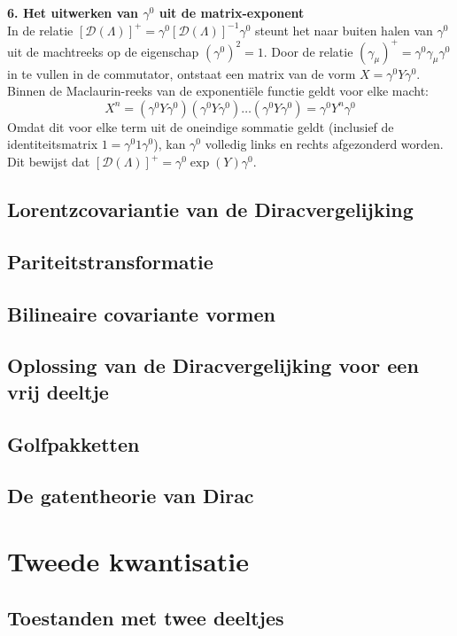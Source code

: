 \documentclass[a4paper,twoside]{article}
\theoremstyle{definition}
\theoremstyle{plain}
\begin{document}
\textbf{6. Het uitwerken van $\gamma^0$ uit de matrix-exponent} \\
In de relatie $[\mathcal{D}(\Lambda)]^+ = \gamma^0 [\mathcal{D}(\Lambda)]^{-1} \gamma^0$ steunt het naar buiten halen van $\gamma^0$ uit de machtreeks op de eigenschap $(\gamma^0)^2 = 1$. Door de relatie $(\gamma_\mu)^+ = \gamma^0 \gamma_\mu \gamma^0$ in te vullen in de commutator, ontstaat een matrix van de vorm $X = \gamma^0 Y \gamma^0$. Binnen de Maclaurin-reeks van de exponentiële functie geldt voor elke macht:
\begin{equation}
X^n = (\gamma^0 Y \gamma^0)(\gamma^0 Y \gamma^0) \dots (\gamma^0 Y \gamma^0) = \gamma^0 Y^n \gamma^0
\end{equation}
Omdat dit voor elke term uit de oneindige sommatie geldt (inclusief de identiteitsmatrix $1 = \gamma^0 1 \gamma^0$), kan $\gamma^0$ volledig links en rechts afgezonderd worden. Dit bewijst dat $[\mathcal{D}(\Lambda)]^+ = \gamma^0 \exp(Y) \gamma^0$.

\subsection{Lorentzcovariantie van de Diracvergelijking}
\subsection{Pariteitstransformatie}
\subsection{Bilineaire covariante vormen}
\subsection{Oplossing van de Diracvergelijking voor een vrij deeltje}
\subsection{Golfpakketten}
\subsection{De gatentheorie van Dirac}

\section{Tweede kwantisatie}
\subsection{Toestanden met twee deeltjes}
\end{document}
